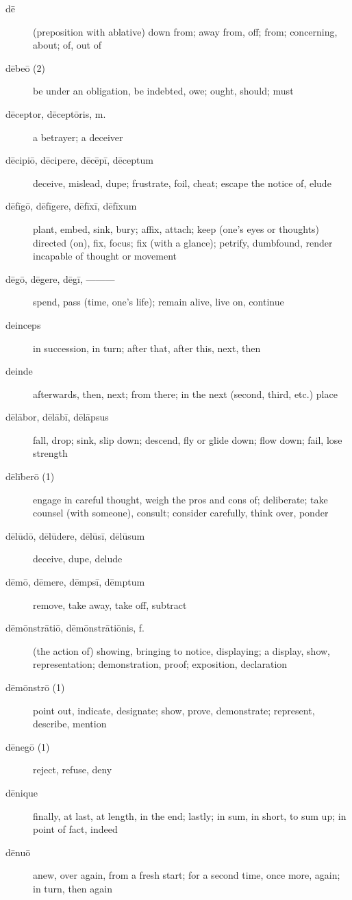 \begin{description}
    \item[dē] \marginnote{*}(preposition with ablative) down from; away from, off; from; concerning, about; of, out of
    \item[dēbeō (2)] \marginnote{*}be under an obligation, be indebted, owe; ought, should; must
    \item[dēceptor, dēceptōris, m.] a betrayer; a deceiver
    \item[dēcipiō, dēcipere, dēcēpī, dēceptum] deceive, mislead, dupe; frustrate, foil, cheat; escape the notice of, elude
    \item[dēfīgō, dēfīgere, dēfīxī, dēfīxum] plant, embed, sink, bury; affix, attach; keep (one's eyes or thoughts) directed (on), fix, focus; fix (with a glance); petrify, dumbfound, render incapable of thought or movement
    \item[dēgō, dēgere, dēgī, ———] spend, pass (time, one's life); remain alive, live on, continue
    \item[deinceps] in succession, in turn; after that, after this, next, then
    \item[deinde] \marginnote{*}afterwards, then, next; from there; in the next (second, third, etc.) place
    \item[dēlābor, dēlābī, dēlāpsus] fall, drop; sink, slip down; descend, fly or glide down; flow down; fail, lose strength
    \item[dēlīberō (1)] engage in careful thought, weigh the pros and cons of; deliberate; take counsel (with someone), consult; consider carefully, think over, ponder
    \item[dēlūdō, dēlūdere, dēlūsī, dēlūsum] deceive, dupe, delude
    \item[dēmō, dēmere, dēmpsī, dēmptum] remove, take away, take off, subtract
    \item[dēmōnstrātiō, dēmōnstrātiōnis, f.] (the action of) showing, bringing to notice, displaying; a display, show, representation; demonstration, proof; exposition, declaration
    \item[dēmōnstrō (1)] point out, indicate, designate; show, prove, demonstrate; represent, describe, mention
    \item[dēnegō (1)] reject, refuse, deny
    \item[dēnique] \marginnote{*}finally, at last, at length, in the end; lastly; in sum, in short, to sum up; in point of fact, indeed
    \item[dēnuō] anew, over again, from a fresh start; for a second time, once more, again; in turn, then again

\end{description}
